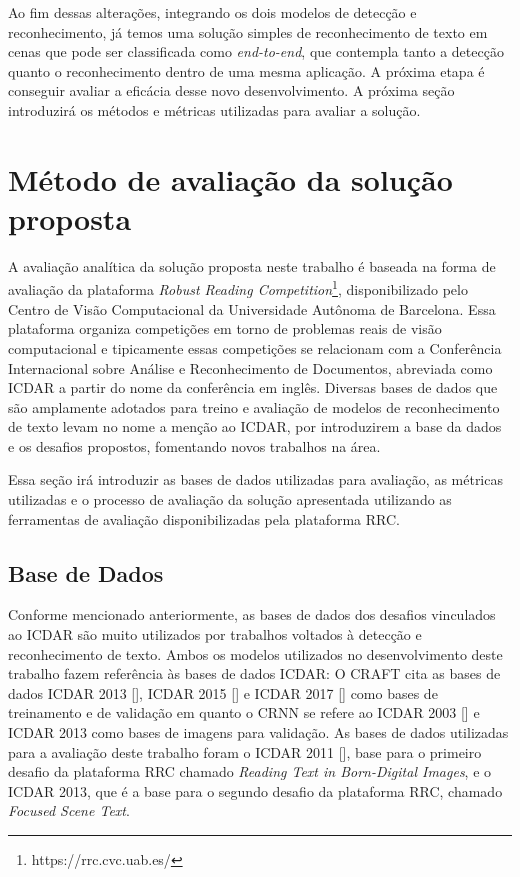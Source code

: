 Ao fim dessas alterações, integrando os dois modelos de detecção e reconhecimento, já temos uma solução simples de reconhecimento de texto em cenas que pode ser classificada como \textit{end-to-end}, que contempla tanto a detecção quanto o reconhecimento dentro de uma mesma aplicação. A próxima etapa é conseguir avaliar a eficácia desse novo desenvolvimento. A próxima seção introduzirá os métodos e métricas utilizadas para avaliar a solução.

\section{Método de avaliação da solução proposta}\label{sec:methodology_validation}

A avaliação analítica da solução proposta neste trabalho é baseada na forma de avaliação da plataforma \textit{Robust Reading Competition}\footnote{https://rrc.cvc.uab.es/}, disponibilizado pelo Centro de Visão Computacional da Universidade Autônoma de Barcelona. Essa plataforma organiza competições em torno de problemas reais de visão computacional e tipicamente essas competições se relacionam com a Conferência Internacional sobre Análise e Reconhecimento de Documentos, abreviada como ICDAR a partir do nome da conferência em inglês. Diversas bases de dados que são amplamente adotados para treino e avaliação de modelos de reconhecimento de texto levam no nome a menção ao ICDAR, por introduzirem a base da dados e os desafios propostos, fomentando novos trabalhos na área.

Essa seção irá introduzir as bases de dados utilizadas para avaliação, as métricas utilizadas e o processo de avaliação da solução apresentada utilizando as ferramentas de avaliação disponibilizadas pela plataforma RRC.

\subsection{Base de Dados}\label{sec:methodology_datasets}

Conforme mencionado anteriormente, as bases de dados dos desafios vinculados ao ICDAR são muito utilizados por trabalhos voltados à detecção e reconhecimento de texto. Ambos os modelos utilizados no desenvolvimento deste trabalho fazem referência às bases de dados ICDAR: O CRAFT cita as bases de dados ICDAR 2013 [], ICDAR 2015 [] e ICDAR 2017 [] como bases de treinamento e de validação em quanto o CRNN se refere ao ICDAR 2003 [] e ICDAR 2013 como bases de imagens para validação. As bases de dados utilizadas para a avaliação deste trabalho foram o ICDAR 2011 [], base para o primeiro desafio da plataforma RRC chamado \textit{Reading Text in Born-Digital Images}, e o ICDAR 2013, que é a base para o segundo desafio da plataforma RRC, chamado \textit{Focused Scene Text}.

